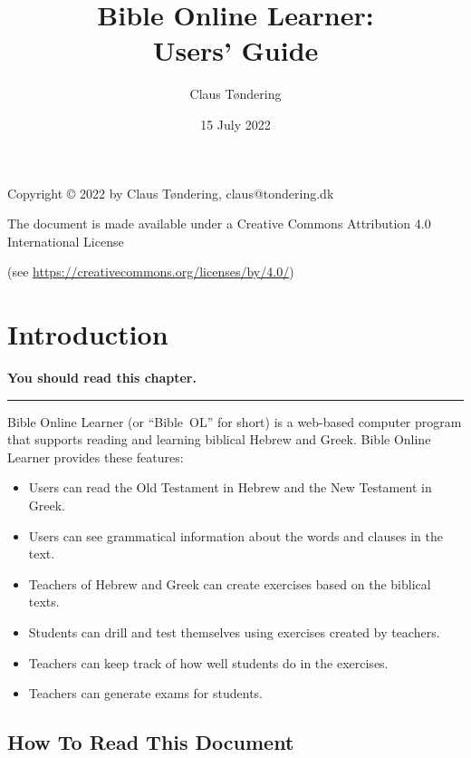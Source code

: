 \documentclass[11pt,oneside,a4paper]{memoir}
\title{Bible Online Learner:\\Users' Guide}
\author{Claus Tøndering}
\date{15 July 2022}
\begin{document}
\begin{titlingpage*}
\maketitle

\begin{center}
Copyright © 2022 by Claus Tøndering, claus@tondering.dk

\vspace{5mm}

The document is made available under a Creative Commons Attribution 4.0 International License

(see \url{https://creativecommons.org/licenses/by/4.0/})
\end{center}
\end{titlingpage*}


\clearpage
\tableofcontents
{} %

\chapter{Introduction}

\textbf{You should read this chapter.}
\plainbreak{3}

Bible Online Learner (or ``Bible~OL'' for short) is a web-based computer program that supports
reading and learning biblical Hebrew and Greek. Bible Online Learner provides these features:


\begin{itemize}
\item Users can read the Old Testament in Hebrew and the New Testament in Greek.
\item Users can see grammatical information about the words and clauses in the text.
\item Teachers of Hebrew and Greek can create exercises based on the biblical texts.
\item Students can drill and test themselves using exercises created by teachers.
\item Teachers can keep track of how well students do in the exercises.
\item Teachers can generate exams for students.
\end{itemize}


\section{How To Read This Document}
\end{document}
